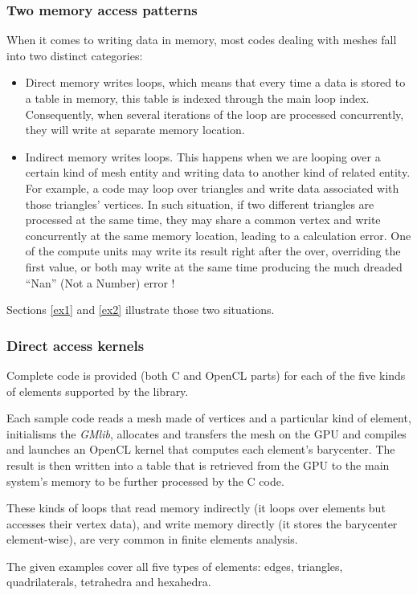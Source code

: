 \documentclass[a4paper,12pt]{article}
\begin{document}
\subsubsection*{Two memory access patterns}
When it comes to writing data in memory, most codes dealing with meshes fall into two distinct categories:
\begin{itemize}
\item Direct memory writes loops, which means that every time a data is stored to a table in memory, this table is indexed through the main loop index. Consequently, when several iterations of the loop are processed concurrently, they will write at separate memory location.
\item Indirect memory writes loops. This happens when we are looping over a certain kind of mesh entity and writing data to another kind of related entity. For example, a code may loop over triangles and write data associated with those triangles' vertices. In such situation, if two different triangles are processed at the same time, they may share a common vertex and write concurrently at the same memory location, leading to a calculation error. One of the compute units may write its result right after the over, overriding the first value, or both may write at the same time producing the much dreaded ``Nan'' (Not a Number) error !
\end{itemize}

Sections \ref{ex1} and \ref{ex2} illustrate those two situations.

\subsubsection*{Direct access kernels}
Complete code is provided (both C and OpenCL parts) for each of the five kinds of elements supported by the library.

Each sample code reads a mesh made of vertices and a particular kind of element, initialisms the \emph{GMlib}, allocates and transfers the mesh on the GPU and compiles and launches an OpenCL kernel that computes each element's barycenter. The result is then written into a table that is retrieved from the GPU to the main system's memory to be further processed by the C code.

These kinds of loops that read memory indirectly (it loops over elements but accesses their vertex data), and write memory directly (it stores the barycenter element-wise), are very common in finite elements analysis.

The given examples cover all five types of elements: edges, triangles, quadrilaterals, tetrahedra and hexahedra.
\end{document}
